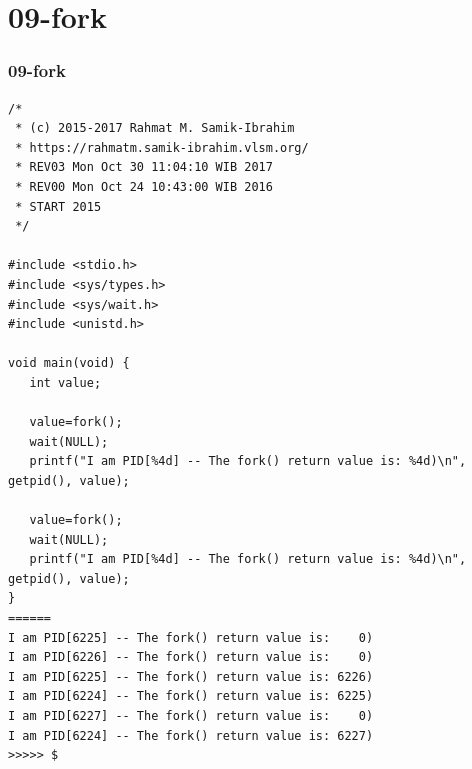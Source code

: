 \documentclass[xcolor=table, notheorems, hyperref={pdfpagelabels=false}]{beamer}
\begin{document}
\section{09-fork}
\begin{frame}[fragile]
\frametitle{09-fork}
\begin{lstlisting}[basicstyle=\ttfamily\tiny]
/*
 * (c) 2015-2017 Rahmat M. Samik-Ibrahim
 * https://rahmatm.samik-ibrahim.vlsm.org/
 * REV03 Mon Oct 30 11:04:10 WIB 2017
 * REV00 Mon Oct 24 10:43:00 WIB 2016
 * START 2015
 */

#include <stdio.h>
#include <sys/types.h>
#include <sys/wait.h>
#include <unistd.h>

void main(void) {
   int value;

   value=fork();
   wait(NULL);
   printf("I am PID[%4d] -- The fork() return value is: %4d)\n", getpid(), value);

   value=fork();
   wait(NULL);
   printf("I am PID[%4d] -- The fork() return value is: %4d)\n", getpid(), value);
}
======
I am PID[6225] -- The fork() return value is:    0)
I am PID[6226] -- The fork() return value is:    0)
I am PID[6225] -- The fork() return value is: 6226)
I am PID[6224] -- The fork() return value is: 6225)
I am PID[6227] -- The fork() return value is:    0)
I am PID[6224] -- The fork() return value is: 6227)
>>>>> $ 

\end{lstlisting}
\end{frame}

\end{document}
